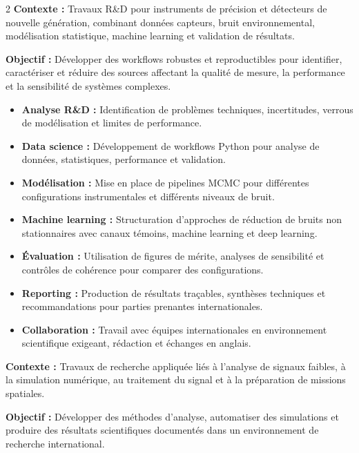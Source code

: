 \documentclass[8pt,a4paper,ragged2e,withhyper]{altacv}
\begin{document}
\begin{paracol}{2}
\textbf{Contexte :} Travaux R\&D pour instruments de précision et détecteurs de nouvelle génération, combinant données capteurs, bruit environnemental, modélisation statistique, machine learning et validation de résultats.

\textbf{Objectif :} Développer des workflows robustes et reproductibles pour identifier, caractériser et réduire des sources affectant la qualité de mesure, la performance et la sensibilité de systèmes complexes.

\begin{itemize}
  \item \textbf{Analyse R\&D :} Identification de problèmes techniques, incertitudes, verrous de modélisation et limites de performance.
  \item \textbf{Data science :} Développement de workflows Python pour analyse de données, statistiques, performance et validation.
  \item \textbf{Modélisation :} Mise en place de pipelines MCMC pour différentes configurations instrumentales et différents niveaux de bruit.
  \item \textbf{Machine learning :} Structuration d’approches de réduction de bruits non stationnaires avec canaux témoins, machine learning et deep learning.
  \item \textbf{Évaluation :} Utilisation de figures de mérite, analyses de sensibilité et contrôles de cohérence pour comparer des configurations.
  \item \textbf{Reporting :} Production de résultats traçables, synthèses techniques et recommandations pour parties prenantes internationales.
  \item \textbf{Collaboration :} Travail avec équipes internationales en environnement scientifique exigeant, rédaction et échanges en anglais.
\end{itemize}

\divider


\textbf{Contexte :} Travaux de recherche appliquée liés à l’analyse de signaux faibles, à la simulation numérique, au traitement du signal et à la préparation de missions spatiales.

\textbf{Objectif :} Développer des méthodes d’analyse, automatiser des simulations et produire des résultats scientifiques documentés dans un environnement de recherche international.


\end{paracol}
\end{document}
